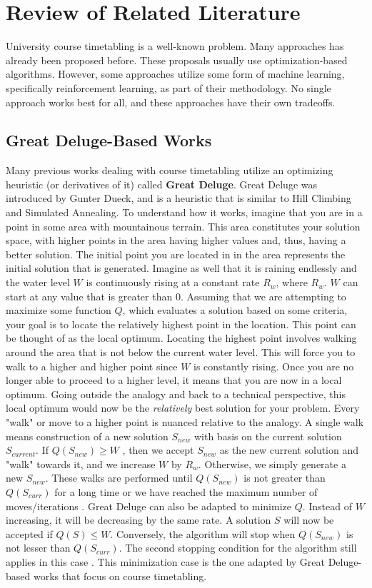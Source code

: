 \chapter{Review of Related Literature} \label{sec:rrl-title}
University course timetabling is a well-known problem. Many approaches has already been proposed before. These proposals usually use optimization-based algorithms. However, some approaches utilize some form of machine learning, specifically reinforcement learning, as part of their methodology. No single approach works best for all, and these approaches have their own tradeoffs.

\section{Great Deluge-Based Works}
Many previous works dealing with course timetabling utilize an optimizing heuristic (or derivatives of it) called \textbf{Great Deluge}. Great Deluge was introduced by Gunter Dueck, and is a heuristic that is similar to Hill Climbing and Simulated Annealing. To understand how it works, imagine that you are in a point in some area with mountainous terrain. This area constitutes your solution space, with higher points in the area having higher values and, thus, having a better solution. The initial point you are located in in the area represents the initial solution that is generated. Imagine as well that it is raining endlessly and the water level $W$ is continuously rising at a constant rate $R_{w}$, where $R_{w}$. $W$ can start at any value that is greater than $0$. Assuming that we are attempting to maximize some function $Q$, which evaluates a solution based on some criteria, your goal is to locate the relatively highest point in the location. This point can be thought of as the local optimum. Locating the highest point involves walking around the area that is not below the current water level. This will force you to walk to a higher and higher point since $W$ is constantly rising. Once you are no longer able to proceed to a higher level, it means that you are now in a local optimum. Going outside the analogy and back to a technical perspective, this local optimum would now be the \textit{relatively} best solution for your problem. Every "walk" or move to a higher point is nuanced relative to the analogy. A single walk means construction of a new solution $S_{new}$ with basis on the current solution $S_{current}$. If $Q(S_{new}) \geq W$ \cite{gd-burke}, then we accept $S_{new}$ as the new current solution and "walk" towards it, and we increase $W$ by $R_{w}$. Otherwise, we simply generate a new $S_{new}$. These walks are performed until $Q(S_{new})$ is not greater than $Q(S_{curr})$ for a long time or we have reached the maximum number of moves/iterations \cite{intro-gd-dueck}. Great Deluge can also be adapted to minimize $Q$. Instead of $W$ increasing, it will be decreasing by the same rate. A solution $S$ will now be accepted if $Q(S) \leq W$. Conversely, the algorithm will stop when $Q(S_{new})$ is not lesser than $Q(S_{curr})$. The second stopping condition for the algorithm still applies in this case \cite{gd-burke}\cite{nlgd-landa-silva}\cite{nlgdrl-obit}. This minimization case is the one adapted by Great Deluge-based works that focus on course timetabling.

